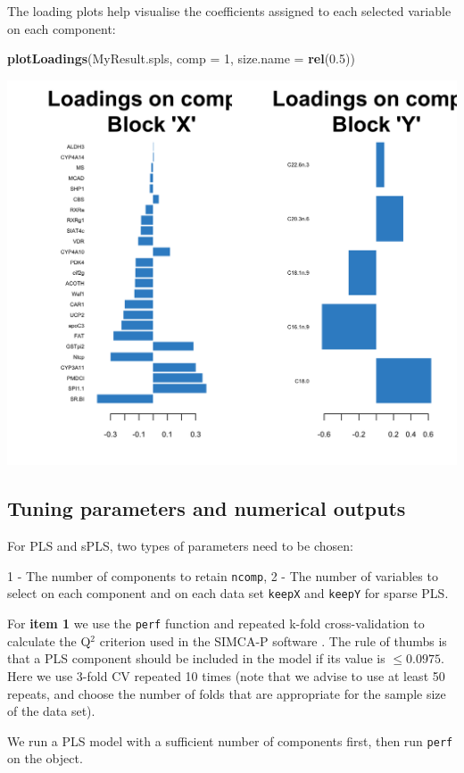 \documentclass[]{book}
\newenvironment{Shaded}{\begin{snugshade}}{\end{snugshade}}
\newcommand{\KeywordTok}[1]{\textcolor[rgb]{0.13,0.29,0.53}{\textbf{#1}}}
\newcommand{\DataTypeTok}[1]{\textcolor[rgb]{0.13,0.29,0.53}{#1}}
\newcommand{\DecValTok}[1]{\textcolor[rgb]{0.00,0.00,0.81}{#1}}
\newcommand{\FloatTok}[1]{\textcolor[rgb]{0.00,0.00,0.81}{#1}}
\newcommand{\NormalTok}[1]{#1}
\theoremstyle{definition}
\theoremstyle{definition}
\theoremstyle{definition}
\theoremstyle{remark}
\begin{document}
The loading plots help visualise the coefficients assigned to each
selected variable on each component:

\begin{Shaded}
\begin{Highlighting}[]
\KeywordTok{plotLoadings}\NormalTok{(MyResult.spls, }\DataTypeTok{comp =} \DecValTok{1}\NormalTok{, }\DataTypeTok{size.name =} \KeywordTok{rel}\NormalTok{(}\FloatTok{0.5}\NormalTok{))}
\end{Highlighting}
\end{Shaded}

\begin{center}\includegraphics[width=0.5\linewidth]{Figures/unnamed-chunk-10-1} \end{center}

\subsection{Tuning parameters and numerical
outputs}\label{tuning-parameters-and-numerical-outputs}

For PLS and sPLS, two types of parameters need to be chosen:

1 - The number of components to retain \texttt{ncomp}, 2 - The number of
variables to select on each component and on each data set
\texttt{keepX} and \texttt{keepY} for sparse PLS.

For \textbf{item 1} we use the \texttt{perf} function and repeated
k-fold cross-validation to calculate the Q\(^2\) criterion used in the
SIMCA-P software \citep{Ume96}. The rule of thumbs is that a PLS
component should be included in the model if its value is
\(\leq 0.0975\). Here we use 3-fold CV repeated 10 times (note that we
advise to use at least 50 repeats, and choose the number of folds that
are appropriate for the sample size of the data set).

We run a PLS model with a sufficient number of components first, then
run \texttt{perf} on the object.
\end{document}
